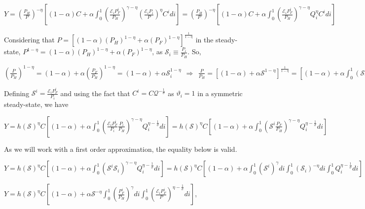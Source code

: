 \documentclass[
]{article}
\begin{document}
\(\displaystyle Y = \left( \frac{P_{H}}{P} \right)^{-\eta} \left[ (1-\alpha)C + \alpha \int_0^1 \left( \frac{ \mathcal{E}_i P_F^i }{P_H} \right)^{\gamma-\eta} \left( \frac{\mathcal{E}_i P_i}{P} \right)^\eta C^idi \right] = \left( \frac{P_{H}}{P} \right)^{-\eta} \left[ (1-\alpha)C + \alpha \int_0^1 \left( \frac{ \mathcal{E}_i P_F^i }{P_H} \right)^{\gamma-\eta} Q_i^\eta C^idi \right]\)

Considering that
\(\displaystyle P = \left[ (1-\alpha) \left( P_H \right)^{1-\eta} + \alpha \left( P_F\right)^{1-\eta} \right]^{\frac{1}{1-\eta}}\)
in the steady-state,
\(\displaystyle P^{1-\eta} = (1-\alpha) \left( P_H \right)^{1-\eta} + \alpha \left( P_F \right)^{1-\eta}\),
as \(\displaystyle \mathcal{S}_i \equiv \frac{P_i}{P_H}\). So,

\(\displaystyle \left( \frac{P}{P_H} \right)^{1-\eta} = (1-\alpha) + \alpha \left( \frac{P_F}{P_H}\right)^{1-\eta} = (1-\alpha) + \alpha \mathcal{S}_i^{1-\eta} \ \ \Rightarrow \ \ \frac{P}{P_H}=\left[ (1-\alpha)+\alpha \mathcal{S}^{1-\eta}\right]^{\frac{1}{1-\eta}}= \left[ (1-\alpha) + \alpha \int_0^1(\mathcal{S}_i)^{1-\eta}di \right]^{\frac{1}{1-\eta}} \equiv h(\mathcal{S})\)

Defining
\(\displaystyle \mathcal{S}^i = \frac{\mathcal{E}_i P_F^i}{P_i}\) and
using the fact that
\(\displaystyle C^i=C \mathcal{Q}^{-\frac{1}{\sigma}}\) as
\(\vartheta_i = 1\) in a symmetric steady-state, we have

\(\displaystyle Y = h(\mathcal{S})^{\eta}C \left[ (1-\alpha) + \alpha \int_0^1 \left( \frac{ \mathcal{E}_i P_F^i }{P_i} \frac{P_i}{P_H} \right)^{\gamma-\eta} Q_i^{\eta-\frac{1}{\sigma}} di \right]= h(\mathcal{S})^{\eta}C \left[ (1-\alpha) + \alpha \int_0^1 \left( \mathcal{S}^i \frac{P_F}{P_H} \right)^{\gamma-\eta} Q_i^{\eta-\frac{1}{\sigma}} di \right]\)

As we will work with a first order approximation, the equality below is
valid.

\(\displaystyle Y = h(\mathcal{S})^{\eta}C \left[ (1-\alpha) + \alpha \int_0^1 \left( \mathcal{S}^i \mathcal{S}_i \right)^{\gamma-\eta} Q_i^{\eta-\frac{1}{\sigma}} di \right] = h(\mathcal{S})^{\eta}C \left[ (1-\alpha) + \alpha \int_0^1 ( \mathcal{S}^i)^{\gamma} di \int_0^1 ( \mathcal{S}_i)^{-\eta} di \int_0^1 Q_i^{\eta-\frac{1}{\sigma}} di \right]\)

\(\displaystyle Y = h(\mathcal{S})^{\eta}C \left[ (1-\alpha) + \alpha \mathcal{S}^{-\eta} \int_0^1 \left( \frac{P_F^i}{P_H} \right)^{\gamma} di \int_0^1 \left( \frac{\mathcal{E}_i P_F^i}{P} \right)^{\eta-\frac{1}{\sigma}} di \right]\),
\end{document}
